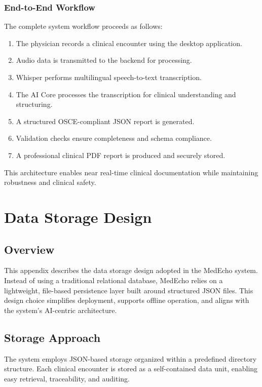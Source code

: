 \documentclass[12pt,a4paper]{report}
\begin{document}
\subsection{End-to-End Workflow}

The complete system workflow proceeds as follows:

\begin{enumerate}
    \item The physician records a clinical encounter using the desktop application.
    \item Audio data is transmitted to the backend for processing.
    \item Whisper performs multilingual speech-to-text transcription.
    \item The AI Core processes the transcription for clinical understanding and structuring.
    \item A structured OSCE-compliant JSON report is generated.
    \item Validation checks ensure completeness and schema compliance.
    \item A professional clinical PDF report is produced and securely stored.
\end{enumerate}

This architecture enables near real-time clinical documentation while maintaining robustness and clinical safety.


\chapter{Data Storage Design}\label{appendix:dsb}
\section{Overview}
This appendix describes the data storage design adopted in the MedEcho system. Instead of using a traditional relational database, MedEcho relies on a lightweight, file-based persistence layer built around structured JSON files. This design choice simplifies deployment, supports offline operation, and aligns with the system’s AI-centric architecture.

\section{Storage Approach}
The system employs JSON-based storage organized within a predefined directory structure. Each clinical encounter is stored as a self-contained data unit, enabling easy retrieval, traceability, and auditing.
\end{document}
